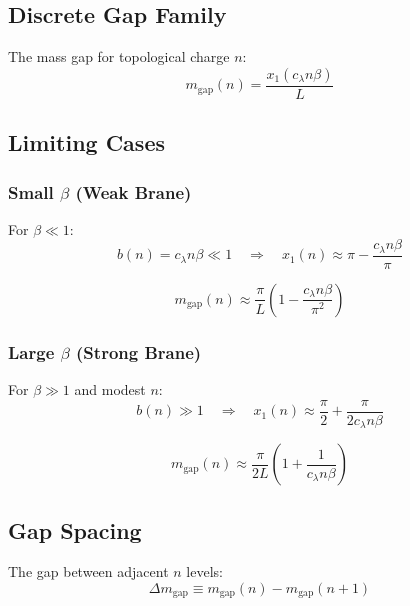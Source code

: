 \documentclass[11pt,a4paper]{article}
\newcommand{\mgap}{m_{\mathrm{gap}}}
\theoremstyle{definition}
\theoremstyle{plain}
\theoremstyle{remark}
\begin{document}
\subsection{Discrete Gap Family}

The mass gap for topological charge $n$:
\begin{equation}
\boxed{\mgap(n) = \frac{x_1(c_\lambda n \beta)}{L}}
\label{eq:gap-n}
\end{equation}

\subsection{Limiting Cases}

\subsubsection{Small $\beta$ (Weak Brane)}

For $\beta \ll 1$:
\begin{equation}
b(n) = c_\lambda n \beta \ll 1 \quad \Rightarrow \quad x_1(n) \approx \pi - \frac{c_\lambda n\beta}{\pi}
\label{eq:small-beta}
\end{equation}

\begin{equation}
\mgap(n) \approx \frac{\pi}{L}\left(1 - \frac{c_\lambda n\beta}{\pi^2}\right)
\label{eq:gap-small-beta}
\end{equation}

\subsubsection{Large $\beta$ (Strong Brane)}

For $\beta \gg 1$ and modest $n$:
\begin{equation}
b(n) \gg 1 \quad \Rightarrow \quad x_1(n) \approx \frac{\pi}{2} + \frac{\pi}{2c_\lambda n\beta}
\label{eq:large-beta}
\end{equation}

\begin{equation}
\mgap(n) \approx \frac{\pi}{2L}\left(1 + \frac{1}{c_\lambda n\beta}\right)
\label{eq:gap-large-beta}
\end{equation}

\subsection{Gap Spacing}

The gap between adjacent $n$ levels:
\begin{equation}
\Delta\mgap \equiv \mgap(n) - \mgap(n+1)
\label{eq:gap-spacing-def}
\end{equation}
\end{document}
